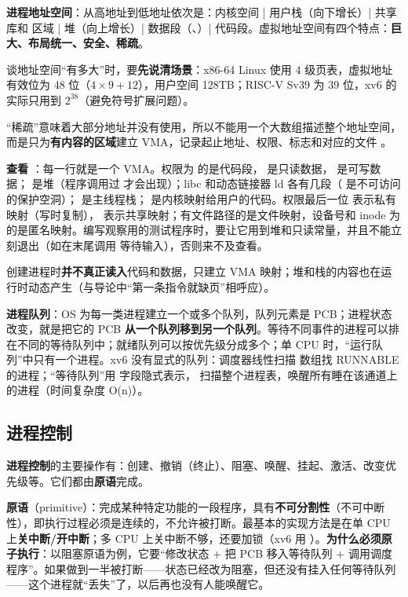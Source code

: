 \textbf{进程地址空间}：从高地址到低地址依次是：内核空间 | 用户栈（向下增长）| 共享库和  区域 | 堆（向上增长）| 数据段（、）| 代码段。虚拟地址空间有四个特点：\textbf{巨大、布局统一、安全、稀疏}。

谈地址空间“有多大”时，要\textbf{先说清场景}：x86-64 Linux 使用 4 级页表，虚拟地址有效位为 48 位（$4\times9+12$），用户空间 128TB；RISC-V Sv39 为 39 位，xv6 的  实际只用到 $2^{38}$（避免符号扩展问题）。

“稀疏”意味着大部分地址并没有使用，所以不能用一个大数组描述整个地址空间，而是只为\textbf{有内容的区域}建立 VMA，记录起止地址、权限、标志和对应的文件 。

\textbf{查看 }：每一行就是一个 VMA。权限为  的是代码段， 是只读数据， 是可写数据；\cd{[heap]} 是堆（程序调用过  才会出现）；libc 和动态链接器 ld 各有几段（ 是不可访问的保护空洞）；\cd{[stack]} 是主线程栈；\cd{[vdso]} 是内核映射给用户的代码。权限最后一位  表示私有映射（写时复制）， 表示共享映射；有文件路径的是文件映射，设备号和 inode 为  的是匿名映射。编写观察用的测试程序时，要让它用到堆和只读常量，并且不能立刻退出（如在末尾调用  等待输入），否则来不及查看。

创建进程时\textbf{并不真正读入}代码和数据，只建立 VMA 映射；堆和栈的内容也在运行时动态产生（与导论中“第一条指令就缺页”相呼应）。

\textbf{进程队列}：OS 为每一类进程建立一个或多个队列，队列元素是 PCB；进程状态改变，就是把它的 PCB \textbf{从一个队列移到另一个队列}。等待不同事件的进程可以排在不同的等待队列中；就绪队列可以按优先级分成多个；单 CPU 时，“运行队列”中只有一个进程。xv6 没有显式的队列：调度器线性扫描  数组找 RUNNABLE 的进程；“等待队列”用  字段隐式表示， 扫描整个进程表，唤醒所有睡在该通道上的进程（时间复杂度 O(n)）。

\subsection{进程控制}

\textbf{进程控制}的主要操作有：创建、撤销（终止）、阻塞、唤醒、挂起、激活、改变优先级等。它们都由\textbf{原语}完成。

\textbf{原语}（primitive）：完成某种特定功能的一段程序，具有\textbf{不可分割性}（不可中断性），即执行过程必须是连续的，不允许被打断。最基本的实现方法是在单 CPU 上\textbf{关中断/开中断}；多 CPU 上关中断不够，还要加锁（xv6 用 ）。\textbf{为什么必须原子执行}：以阻塞原语为例，它要“修改状态 + 把 PCB 移入等待队列 + 调用调度程序”。如果做到一半被打断——状态已经改为阻塞，但还没有挂入任何等待队列——这个进程就“丢失”了，以后再也没有人能唤醒它。


